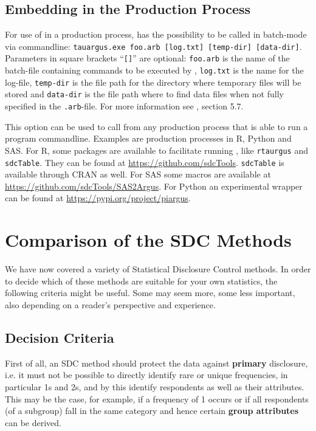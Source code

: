 \subsection{Embedding \targus in the Production Process}
For use of \targus in a production process, \targus has the possibility to be called in batch-mode via commandline: \texttt{tauargus.exe foo.arb [log.txt]\ [temp-dir]\ [data-dir]}. Parameters in square brackets ``\texttt{[]}'' are optional: \texttt{foo.arb} is the name of the batch-file containing commands to be executed by \targus, \texttt{log.txt} is the name for the log-file, \texttt{temp-dir} is the file path for the directory where temporary files will be stored and \texttt{data-dir} is the file path where to find data files when not fully specified in the \texttt{.arb}-file. For more information see \targus \cite{taumanual}, section 5.7.

This option can be used to call \targus from any production process that is able to run a program commandline. Examples are production processes in R, Python and SAS. For R, some packages are available to facilitate running \targus, like \texttt{rtaurgus} and \texttt{sdcTable}. They can be found at \url{https://github.com/sdcTools}. \texttt{sdcTable} is available through CRAN as well. For SAS some macros are available at \url{https://github.com/sdcTools/SAS2Argus}. For Python an experimental wrapper can be found at \url{https://pypi.org/project/piargus}.

\section{Comparison of the SDC Methods}\label{section:comparison}



We have now covered a variety of Statistical Disclosure Control methods. In order to decide which of these methods are suitable for your own statistics, the following criteria might be useful. Some may seem more, some less important, also depending on a reader's perspective and experience. 

\subsection{Decision Criteria}
First of all, an SDC method should protect the data against \textbf{primary} disclosure, i.e. it must not be possible to directly identify rare or unique frequencies, in particular 1s and 2s, and by this identify respondents as well as their attributes. This may be the case, for example, if a frequency of 1 occurs or if all respondents (of a subgroup) fall in the same category and hence certain \textbf{group attributes} can be derived.

